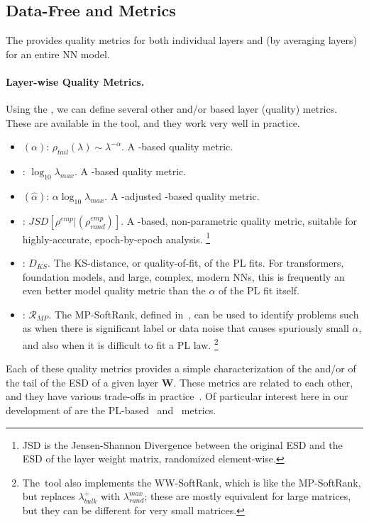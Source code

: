 
\subsection{Data-Free \SHAPE and \SCALE \Quality Metrics}
\label{sxn:htsr-metics}

The \HTSR \Phenomenology provides quality metrics for both individual layers and (by averaging layers) for an entire NN model.

\paragraph{Layer-wise Quality Metrics.}
Using the \HTSR \Phenomenology, we can define several other \SHAPE and/or \SCALE based layer (quality) metrics.
These are available in the \WW tool, and they work very well in practice.
\begin{itemize}
\item 
\ALPHA 
$(\alpha)$: $\rho_{tail}(\lambda)\sim\lambda^{-\alpha}$. 
A \SHAPE-based quality metric.
\item
\LOGSPECTRALNORM: $\log_{10}\lambda_{max}$.
A \SCALE-based quality metric.
\item 
\ALPHAHAT 
$(\hat{\alpha})$: $\alpha\log_{10}\lambda_{max}$.
A \SCALE-adjusted \SHAPE-based quality metric.
\item
\RANDDIST: $JSD[\rho^{emp}|(\rho_{rand}^{emp})]$.
A \SHAPE-based, non-parametric quality metric, suitable for highly-accurate, epoch-by-epoch analysis.%
\footnote{JSD is the Jensen-Shannon Divergence between the original ESD and the ESD of the layer weight matrix, randomized element-wise.}
\item
\PLKS: $D_{KS}$.
The KS-distance, or quality-of-fit, of the PL fits.  
For transformers, foundation models, and large, complex, modern NNs, this is frequently an even better model quality metric than the $\alpha$ of the PL fit itself.
\item
\MPSOFTRANK: $\mathcal{R}_{MP}$.
The MP-SoftRank, defined in~\cite{MM18_TR_JMLRversion}, can be used to identify problems such as when there is significant label or data noise that causes spuriously small $\alpha$, and also when it is difficult to fit a PL law.%
\footnote{The~\WW tool also implements the WW-SoftRank, which is like the MP-SoftRank, but replaces $\lambda_{bulk}^{+}$ with $\lambda_{rand}^{max}$; these are mostly equivalent for large matrices, but they can be different for very small matrices.}
\end{itemize}

\noindent
Each of these quality metrics provides a simple characterization of the \SHAPE and/or \SCALE of the tail of the ESD of a given layer $\mathbf{W}$.
These metrics are related to each other, and they have various trade-offs in practice~\cite{MM20a_trends_NatComm, MM21a_simpsons_TR, YTHx23_KDD}.
Of particular interest here in our development of \SETOL are the PL-based \WW~\ALPHA and  \ALPHAHAT~metrics.


